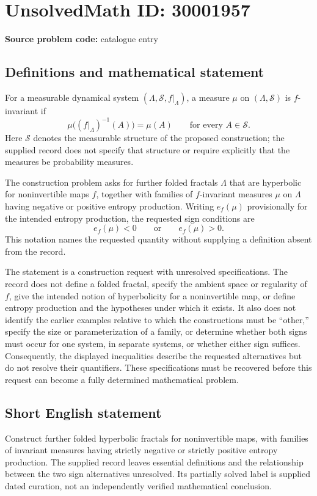 \documentclass[11pt]{article}
\begin{document}
\section*{UnsolvedMath ID: 30001957}
\textbf{Source problem code:} catalogue entry
\subsection{Definitions and mathematical statement}
For a measurable dynamical system \((\Lambda,\mathcal S,f|_\Lambda)\), a measure \(\mu\) on \((\Lambda,\mathcal S)\) is \(f\)-invariant if
\[
\mu\bigl((f|_\Lambda)^{-1}(A)\bigr)=\mu(A)
\qquad\text{for every }A\in\mathcal S.
\]
Here \(\mathcal S\) denotes the measurable structure of the proposed construction; the supplied record does not specify that structure or require explicitly that the measures be probability measures.

The construction problem asks for further folded fractals \(\Lambda\) that are hyperbolic for noninvertible maps \(f\), together with families of \(f\)-invariant measures \(\mu\) on \(\Lambda\) having negative or positive entropy production. Writing \(e_f(\mu)\) provisionally for the intended entropy production, the requested sign conditions are
\[
e_f(\mu)<0
\qquad\text{or}\qquad
e_f(\mu)>0.
\]
This notation names the requested quantity without supplying a definition absent from the record.

The statement is a construction request with unresolved specifications. The record does not define a folded fractal, specify the ambient space or regularity of \(f\), give the intended notion of hyperbolicity for a noninvertible map, or define entropy production and the hypotheses under which it exists. It also does not identify the earlier examples relative to which the constructions must be ``other,'' specify the size or parameterization of a family, or determine whether both signs must occur for one system, in separate systems, or whether either sign suffices. Consequently, the displayed inequalities describe the requested alternatives but do not resolve their quantifiers. These specifications must be recovered before this request can become a fully determined mathematical problem.
\subsection{Short English statement}
Construct further folded hyperbolic fractals for noninvertible maps, with families of invariant measures having strictly negative or strictly positive entropy production. The supplied record leaves essential definitions and the relationship between the two sign alternatives unresolved. Its partially solved label is supplied dated curation, not an independently verified mathematical conclusion.
\end{document}
